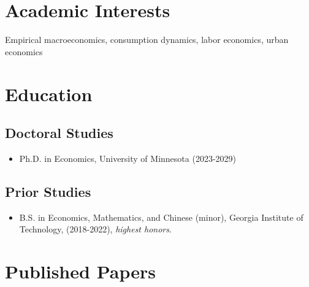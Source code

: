 \documentclass{cv_style}
\begin{document}

    \begin{center}  

    
	\end{center}
	
	\section{Academic Interests}
	Empirical macroeconomics, consumption dynamics, labor economics, urban economics

	\section{Education}
		\subsection{Doctoral Studies}
				\begin{itemize}
					\item Ph.D. in Economics, University of Minnesota (2023-2029)
				\end{itemize}
				
		\subsection{Prior Studies}
				\begin{itemize}
					\item B.S. in Economics, Mathematics, and Chinese (minor), Georgia Institute of Technology, (2018-2022), \textit{highest honors}.
				\end{itemize}
		

	\section{Published Papers}
		\begin{etaremune}			
					\item {}
					
					
		\end{etaremune}
\end{document}
